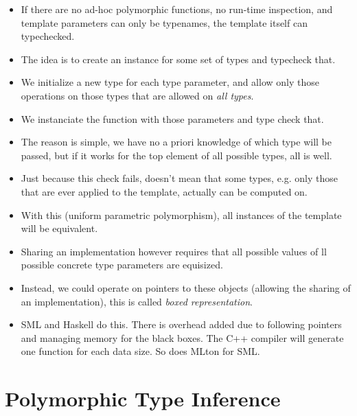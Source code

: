 \begin{itemize}

\item If there are no ad-hoc polymorphic functions, no run-time inspection, and
template parameters can only be typenames, the template itself can typechecked.

\item The idea is to create an instance for some set of types and typecheck that.

\item We initialize a new type for each type parameter, and allow only those
operations on those types that are allowed on \emph{all types}.

\item We instanciate the function with those parameters and type check that.

\item The reason is simple, we have no a priori knowledge of which type will be
passed, but if it works for the top element of all possible types, all is well.

\item Just because this check fails, doesn't mean that some types, e.g. only
those that are ever applied to the template, actually can be computed on.

\item With this (uniform parametric polymorphism), all instances of the
template will be equivalent.

\item Sharing an implementation however requires that all possible values of ll
possible concrete type parameters are equisized.

\item Instead, we could operate on pointers to these objects (allowing the
sharing of an implementation), this is called \emph{boxed representation}.

\item SML and Haskell do this. There is overhead added due to following
pointers and managing memory for the black boxes. The C++ compiler will
generate one function for each data size. So does MLton for SML.

\end{itemize}

\section{Polymorphic Type Inference}

